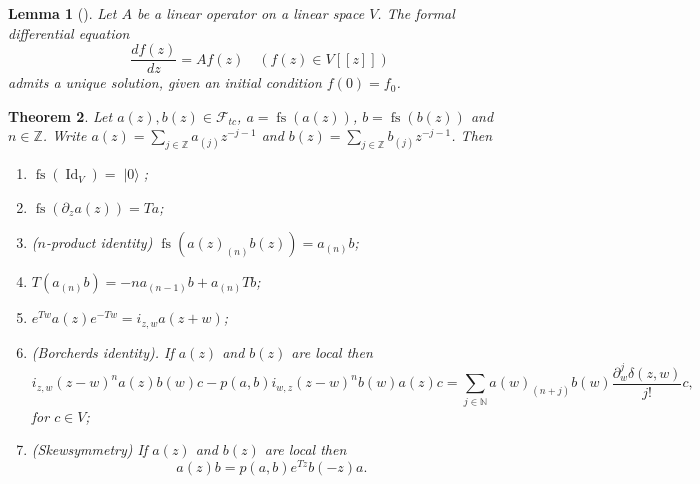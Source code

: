 \documentclass[a4paper, 12pt, reqno]{amsart}
\newtheorem{theorem}{Theorem}[subsection]
\newtheorem{lemma}[theorem]{Lemma}
\theoremstyle{remark}
\numberwithin{equation}{subsection}
\DeclareMathOperator{\Id}{Id}
\DeclareMathOperator{\vac}{|0\rangle}
\DeclareMathOperator{\fs}{fs}
\begin{document}
\begin{lemma}[{\cite[Proposition 4.3.2]{nozaradan_introduction_2008}}]
  \label{lmm:4}
  Let $A$ be a linear operator on a linear space $V$.
  The formal differential equation
  \begin{equation*}
    \frac{df(z)}{dz} = Af(z) \quad (f(z) \in V[[z]])
  \end{equation*}
  admits a unique solution, given an initial condition $f(0)=f_0$.
\end{lemma}

\begin{theorem}
  \label{thr:11}
  Let $a(z), b(z) \in \mathcal{F}_{tc}$, $a = \fs(a(z))$, $b = \fs(b(z))$ and $n \in \mathbb{Z}$.
  Write $a(z) = \sum_{j \in \mathbb{Z}}a_{(j)}z^{-j - 1}$ and $b(z) = \sum_{j \in \mathbb{Z}}b_{(j)}z^{-j - 1}$.
  Then
  \begin{enumerate}
  \item $\fs(\Id_V) = \vac$;
  \item $\fs(\partial_za(z)) = Ta$;
  \item ($n$-product identity) $\fs(a(z)_{(n)}b(z)) = a_{(n)}b$;
  \item $T(a_{(n)}b) = -na_{(n - 1)}b + a_{(n)}Tb$;
  \item $e^{Tw}a(z)e^{-Tw} = i_{z, w}a(z + w)$;
  \item (Borcherds identity). If $a(z)$ and $b(z)$ are local then
    \begin{equation*}
      i_{z,w}(z-w)^na(z)b(w)c-p(a,b)i_{w,z}(z-w)^nb(w)a(z)c=\sum_{j\in \mathbb{N}}a(w)_{(n+j)}b(w)\frac{\partial^j_w\delta(z,w)}{j!}c,
    \end{equation*}
    for $c\in V$;
  \item (Skewsymmetry) If $a(z)$ and $b(z)$ are local then
    \begin{equation*}
      a(z)b=p(a,b)e^{Tz}b(-z)a.
    \end{equation*}
  \end{enumerate}
\end{theorem}
\end{document}
